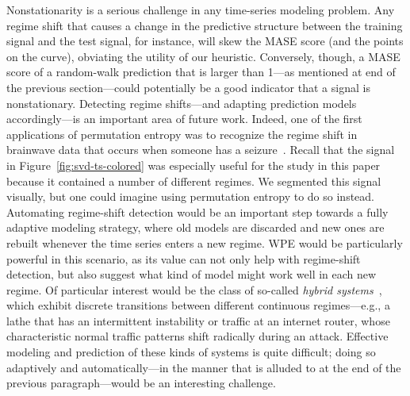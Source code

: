 
Nonstationarity is a serious challenge in any time-series modeling
problem.  Any regime shift that causes a change in the predictive
structure between the training signal and the test signal, for
instance, will skew the MASE score (and the points on the curve),
obviating the utility of our heuristic.  \alert{Conversely, though,} a
MASE score of a random-walk prediction that is larger than 1---as
mentioned at end of the previous section---could potentially be a good
indicator that a signal is nonstationary.  Detecting regime
shifts---and adapting prediction models accordingly---is an important
area of future work.  Indeed, one of the first applications of
permutation entropy was to recognize the regime shift in brainwave
data that occurs when someone has a seizure~\cite{cao2004det}.  Recall
that the signal in Figure~\ref{fig:svd-ts-colored} was especially
useful for the study in this paper because it contained a number of
different regimes.  We segmented this signal visually, but one could
imagine using permutation entropy to do so instead.  Automating
regime-shift detection would be an important step towards a fully
adaptive modeling strategy, where old models are discarded and new
ones are rebuilt whenever the time series enters a new regime.  WPE
would be particularly powerful in this scenario, as its value can not
only help with regime-shift detection, but also suggest what kind of
model might work well in each new regime.  Of particular interest
would be the class of so-called \emph{hybrid systems}~\cite{hybrid},
which exhibit discrete transitions between different continuous
regimes---e.g., a lathe that has an intermittent instability or
traffic at an internet router, whose characteristic normal traffic
patterns shift radically during an attack.  Effective modeling and
prediction of these kinds of systems is quite difficult; doing so
adaptively and automatically---in the manner that is alluded to at the
end of the previous paragraph---would be an interesting challenge.


